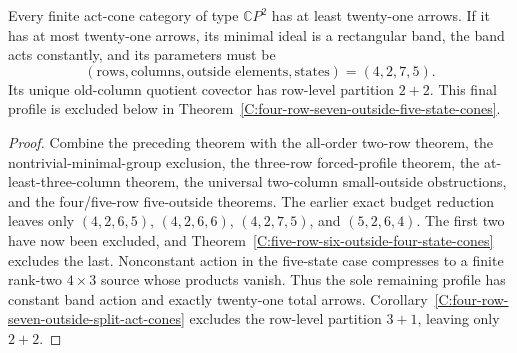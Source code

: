 \begin{corollary}
\label{C:act-cone-twenty-one-frontier}
Every finite act-cone category of type $\mathbb CP^2$ has at least
twenty-one arrows.  If it has at most twenty-one arrows, its minimal
ideal is a rectangular band, the band acts constantly, and its
parameters must be
\[
 (\text{rows},\text{columns},\text{outside elements},\text{states})
   =(4,2,7,5).
\]
Its unique old-column quotient covector has row-level partition $2+2$.
This final profile is excluded below in
Theorem~\ref{C:four-row-seven-outside-five-state-cones}.
\end{corollary}
\begin{proof}
Combine the preceding theorem with the all-order two-row theorem,
the nontrivial-minimal-group exclusion, the three-row forced-profile
theorem, the at-least-three-column theorem, the universal two-column
small-outside obstructions, and the four/five-row five-outside
theorems.  The earlier exact budget reduction leaves only
$(4,2,6,5)$, $(4,2,6,6)$, $(4,2,7,5)$, and $(5,2,6,4)$.
The first two have now been excluded, and
Theorem~\ref{C:five-row-six-outside-four-state-cones} excludes the last.
Nonconstant action in the
five-state case compresses to a finite rank-two $4\times3$ source
whose products vanish.  Thus the sole remaining profile has constant
band action and exactly twenty-one total arrows.
Corollary~\ref{C:four-row-seven-outside-split-act-cones} excludes
the row-level partition $3+1$, leaving only $2+2$.
\end{proof}

